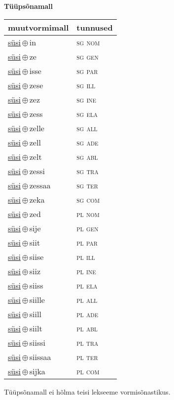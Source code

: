 

\vspace{3.5em}
\noindent \begin{minipage}{\textwidth}
\noindent \textbf{Tüüpsõnamall \,}\\

\begin{sideways}
\begin{tabular}{l l}
muutvormimall & tunnused \\
\hline
\underline{süsi}\,$\oplus$\,in & \textsc{ sg nom } \\
\underline{süsi}\,$\oplus$\,ze & \textsc{ sg gen } \\
\underline{süsi}\,$\oplus$\,isse & \textsc{ sg par } \\
\underline{süsi}\,$\oplus$\,zese & \textsc{ sg ill } \\
\underline{süsi}\,$\oplus$\,zez & \textsc{ sg ine } \\
\underline{süsi}\,$\oplus$\,zess & \textsc{ sg ela } \\
\underline{süsi}\,$\oplus$\,zelle & \textsc{ sg all } \\
\underline{süsi}\,$\oplus$\,zell & \textsc{ sg ade } \\
\underline{süsi}\,$\oplus$\,zelt & \textsc{ sg abl } \\
\underline{süsi}\,$\oplus$\,zessi & \textsc{ sg tra } \\
\underline{süsi}\,$\oplus$\,zessaa & \textsc{ sg ter } \\
\underline{süsi}\,$\oplus$\,zeka & \textsc{ sg com } \\
\underline{süsi}\,$\oplus$\,zed & \textsc{ pl nom } \\
\underline{süsi}\,$\oplus$\,sije & \textsc{ pl gen } \\
\underline{süsi}\,$\oplus$\,siit & \textsc{ pl par } \\
\underline{süsi}\,$\oplus$\,siise & \textsc{ pl ill } \\
\underline{süsi}\,$\oplus$\,siiz & \textsc{ pl ine } \\
\underline{süsi}\,$\oplus$\,siiss & \textsc{ pl ela } \\
\underline{süsi}\,$\oplus$\,siille & \textsc{ pl all } \\
\underline{süsi}\,$\oplus$\,siill & \textsc{ pl ade } \\
\underline{süsi}\,$\oplus$\,siilt & \textsc{ pl abl } \\
\underline{süsi}\,$\oplus$\,siissi & \textsc{ pl tra } \\
\underline{süsi}\,$\oplus$\,siissaa & \textsc{ pl ter } \\
\underline{süsi}\,$\oplus$\,sijka & \textsc{ pl com } \\
\end{tabular}
\end{sideways}
\label{tab:tüüpsõnamall-süsiin}

\end{minipage}

 
\vspace{1em}
\noindent Tüüpsõnamall  ei hõlma teisi lekseeme vormi\-sõnastikus.
